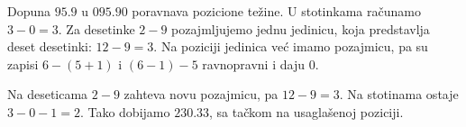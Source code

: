 Dopuna $95.9$ u $095.90$ poravnava pozicione težine. U stotinkama računamo $3-0=3$. Za desetinke $2-9$ pozajmljujemo jednu jedinicu, koja predstavlja deset desetinki: $12-9=3$. Na poziciji jedinica već imamo pozajmicu, pa su zapisi $6-(5+1)$ i $(6-1)-5$ ravnopravni i daju 0.

Na deseticama $2-9$ zahteva novu pozajmicu, pa $12-9=3$. Na stotinama ostaje $3-0-1=2$. Tako dobijamo $230.33$, sa tačkom na usaglašenoj poziciji.
